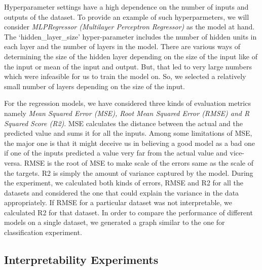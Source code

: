 \documentclass[10pt,twocolumn,letterpaper]{article}
\begin{document}
Hyperparameter settings have a high dependence on the number of inputs and outputs of the dataset. To provide an example of such hyperparmeters, we will consider \textit{MLPRegressor (Multilayer Perceptron Regressor)} as the model at hand. The ‘hidden\_layer\_size’ hyper-parameter includes the number of hidden units in each layer and the number of layers in the model. There are various ways of determining the size of the hidden layer depending on the size of the input like  of the input or mean of the input and output. But, that led to very large numbers which were infeasible for us to train the model on. So, we selected a relatively small number of layers depending on the size of the input.

For the regression models, we have considered three kinds of evaluation metrics namely \textit{Mean Squared Error (MSE), Root Mean Squared Error (RMSE) and R Squared Score (R2)}. MSE calculates the distance between the actual and the predicted value and sums it for all the inputs. Among some limitations of MSE, the major one is that it might deceive us in believing a good model as a bad one if one of the inputs predicted a value very far from the actual value and vice-versa. RMSE is the root of MSE to make scale of the errors same as the scale of the targets. R2 is simply the amount of variance captured by the model. During the experiment, we calculated both kinds of errors, RMSE and R2 for all the datasets and considered the one that could explain the variance in the data appropriately. If RMSE for a particular dataset was not interpretable, we calculated R2 for that dataset.
In order to compare the performance of different models on a single dataset, we generated a graph similar to the one for classification experiment.


\subsection{Interpretability Experiments}
\end{document}
